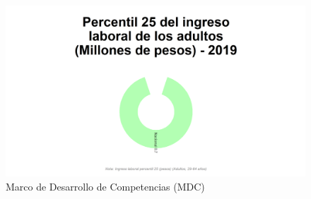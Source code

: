 \begin{figure}[H]
\caption{Marco de Desarrollo de Competencias (MDC) \label{map_result_2} }
\begin{center}
\includegraphics[width=\textwidth,keepaspectratio]{img/var_10_static.png}
\end{center}
\end{figure}